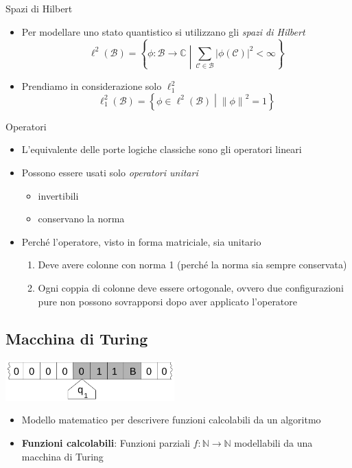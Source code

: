 \documentclass{beamer}
\def\spacedmiddle#1{\mathrel{}\middle#1\mathrel{}}
\begin{document}
\begin{frame}{\subsecname}{Spazi di Hilbert}
	\begin{itemize}
		\item Per modellare uno stato quantistico si utilizzano gli \textit{spazi di Hilbert}
		\[ \ell^{2} \left ( \mathcal{B} \right ) = \left \{ \phi : \mathcal{B} \rightarrow \mathbb{C} \spacedmiddle | \sum_{\mathcal{C} \in \mathcal{B}} \left | \phi \left ( \mathcal{C} \right ) \right |^{2} < \infty \right \}\]
		\item Prendiamo in considerazione solo \(\ell^{2}_{1}\)
		\[ \ell^{2}_{1} \left ( \mathcal{B} \right ) = \left \{ \phi \in \ell^{2} \left ( \mathcal{B} \right ) \spacedmiddle | \left \| \phi \right \|^{2} = 1 \right \}\]
	\end{itemize}
\end{frame}

\begin{frame}{\subsecname}{Operatori}
	\begin{itemize}
		\item L'equivalente delle porte logiche classiche sono gli operatori lineari
		\item Possono essere usati solo \textit{operatori unitari}
		\begin{itemize}
			\item invertibili
			\item conservano la norma
		\end{itemize}
		\item Perché l'operatore, visto in forma matriciale, sia unitario
		\begin{enumerate}
			\item Deve avere colonne con norma 1 (perché la norma sia sempre conservata)
			\item Ogni coppia di colonne deve essere ortogonale, ovvero due configurazioni pure non possono sovrapporsi dopo aver applicato l'operatore
		\end{enumerate}
	\end{itemize}
\end{frame}

\subsection{Macchina di Turing}

\begin{frame}{\subsecname}{}
	\centering\includegraphics[width=6.5cm]{Turing_machine_2b.png}
	\begin{itemize}
		\item Modello matematico per descrivere funzioni calcolabili da un algoritmo
		\item \textbf{Funzioni calcolabili}: Funzioni parziali \( f : \mathbb{N} \rightarrow \mathbb{N} \) modellabili da una macchina di Turing
	\end{itemize}
\end{frame}
\end{document}
